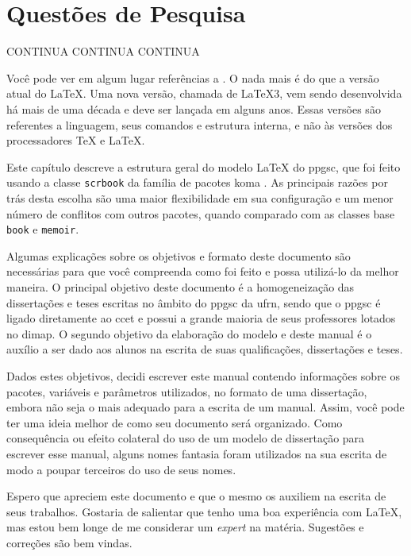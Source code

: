 \section{Questões de Pesquisa}

CONTINUA
CONTINUA
CONTINUA








Você pode ver em algum lugar referências a \LaTeXe{}. O \LaTeXe{} nada mais é do que a versão atual do \LaTeX{}. Uma nova versão, chamada de \LaTeX{}3, vem sendo desenvolvida há mais de uma década e deve ser lançada em alguns anos. Essas versões são referentes a linguagem, seus comandos e estrutura interna, e não às versões dos processadores \TeX{} e \LaTeX{}.

Este capítulo descreve a estrutura geral do modelo \LaTeX{} do \gls{ppgsc}, que foi feito usando a classe \texttt{scrbook} da família de pacotes \gls{koma} \parencite{koma}. As principais razões por trás desta escolha são uma maior flexibilidade em sua configuração e um menor número de conflitos com outros pacotes, quando comparado com as classes base \texttt{book} e \texttt{memoir}. 

Algumas explicações sobre os objetivos e formato deste documento são necessárias para que você compreenda como foi feito e possa utilizá-lo da melhor maneira. O principal objetivo deste documento é a homogeneização das dissertações e teses escritas no âmbito do \gls{ppgsc} da \gls{ufrn}, sendo que o \gls{ppgsc} é ligado diretamente ao \gls{ccet} e possui a grande maioria de seus professores lotados no \gls{dimap}. O segundo objetivo da elaboração do modelo e deste manual é o auxílio a ser dado aos alunos na escrita de suas qualificações, dissertações e teses.

Dados estes objetivos, decidi escrever este manual contendo informações sobre os pacotes, variáveis e parâmetros utilizados, no formato de uma dissertação, embora não seja o mais adequado para a escrita de um manual. Assim, você pode ter uma ideia melhor de como seu documento será organizado. Como consequência ou efeito colateral do uso de um modelo de dissertação para escrever esse manual, alguns nomes fantasia foram utilizados na sua escrita de modo a poupar terceiros do uso de seus nomes.

Espero que apreciem este documento e que o mesmo os auxiliem na escrita de seus trabalhos. Gostaria de salientar que tenho uma boa experiência com \LaTeX , mas estou bem longe de me considerar um \textit{expert} na matéria. Sugestões e correções são bem vindas.

